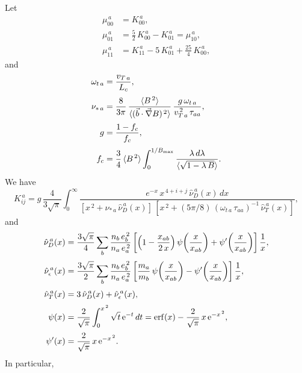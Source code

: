 \documentclass[notitlepage,12pt]{article}
\begin{document}
Let
\begin{align}
\mu_{00}^{\,a} &= K_{00}^{\,a},\\[0.5ex]
\mu_{01}^{\,a} &= \frac{5}{2}\,K_{00}^{\,a}- K_{01}^{\,a}=\mu_{10}^{\,a},\\[0.5ex]
\mu_{11}^{\,a} &= K_{11}^{\,a} - 5\,K_{01}^{\,a}+\frac{25}{4}\,K_{00}^{\,a},
\end{align}
and
\begin{align}
\omega_{t\,a} &=\frac{v_{T\,a}}{L_c},\\[0.5ex]
\nu_{\ast\,a}&= \frac{8}{3\pi}\,\frac{\langle B^{\,2}\rangle}{\langle (\vec{b}\cdot\vec{\nabla}B)^{\,2}\rangle}\,\frac{g\,\omega_{t\,a}}{v_{T\,a}^{\,2}\,\tau_{aa}},\\[0.5ex]
g &= \frac{1-f_c}{f_c},\\[0.5ex]
f_c &= \frac{3}{4}\,\langle B^{\,2}\rangle\int_{0}^{1/B_{\rm max}}\frac{\lambda\,d\lambda}{\langle\sqrt{1-\lambda\,B}\rangle}.
\end{align}
We have
\begin{equation}
K_{ij}^{\,a} = g\,\frac{4}{3\sqrt{\pi}}\int_0^\infty
\frac{e^{-x}\,x^{\,4+i+j}\,\hat{\nu}_D^{\,a}(x)\,dx}{[x^{\,2}+\nu_{\ast\,a}\,\hat{\nu}_D^{\,a}(x)]\,[x^{\,2}+(5\pi/8)\,(\omega_{t\,a}\,\tau_{aa})^{-1}\,\hat{\nu}_T^{\,a}(x)]},
\end{equation}
and 
\begin{align}
\hat{\nu}_D^{\,a}(x)&=\frac{3\sqrt{\pi}}{4}\sum_b 
\frac{n_b\,e_b^{\,2}}{n_a\,e_a^{\,2}}\left[\left(1-\frac{x_{ab}}{2\,x}\right)\psi\!\left(\frac{x}{x_{ab}}\right)
+\psi'\!\left(\frac{x}{x_{ab}}\right)\right]\frac{1}{x},\\[0.5ex]
\hat{\nu}_\epsilon^{\,a}(x)&=\frac{3\sqrt{\pi}}{2}\sum_b 
\frac{n_b\,e_b^{\,2}}{n_a\,e_a^{\,2}}\left[\frac{m_a}{m_b}\,\psi\!\left(\frac{x}{x_{ab}}\right)
-\psi'\!\left(\frac{x}{x_{ab}}\right)\right]\frac{1}{x},\\[0.5ex]
\hat{\nu}_T^{\,a}(x) &= 3\,\hat{\nu}_D^{\,a}(x)+\hat{\nu}_{\epsilon}^{\,a}(x),\\[0.5ex]
\psi(x) &=\frac{2}{\sqrt{\pi}}\int_0^{x^{\,2}}\sqrt{t}\,{\rm e}^{-t}\,dt = {\rm erf}(x)-\frac{2}{\sqrt{\pi}}\,x\,{\rm e}^{-x^{\,2}},\\[0.5ex]
\psi'(x)&= \frac{2}{\sqrt{\pi}}\,x\,{\rm e}^{-x^{\,2}}.
\end{align}
In particular,
\end{document}
